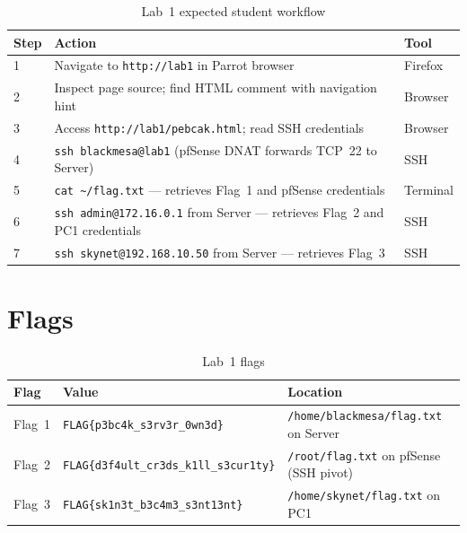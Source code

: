\begin{table}[H]
\centering
\small
\begin{tabularx}{\textwidth}{lXl}
\toprule
\textbf{Step} & \textbf{Action} & \textbf{Tool} \\
\midrule
1 & Navigate to \texttt{http://lab1} in Parrot browser                                       & Firefox  \\
2 & Inspect page source; find HTML comment with navigation hint                              & Browser  \\
3 & Access \texttt{http://lab1/pebcak.html}; read SSH credentials                            & Browser  \\
4 & \texttt{ssh blackmesa@lab1} (pfSense DNAT forwards TCP~22 to Server)                     & SSH      \\
5 & \texttt{cat \textasciitilde/flag.txt} --- retrieves Flag~1 and pfSense credentials        & Terminal \\
6 & \texttt{ssh admin@172.16.0.1} from Server --- retrieves Flag~2 and PC1 credentials       & SSH      \\
7 & \texttt{ssh skynet@192.168.10.50} from Server --- retrieves Flag~3                       & SSH      \\
\bottomrule
\end{tabularx}
\caption{Lab~1 expected student workflow}
\label{tab:lab1-workflow}
\end{table}

\section*{Flags}

\begin{table}[H]
\centering
\begin{tabularx}{\textwidth}{lXl}
\toprule
\textbf{Flag} & \textbf{Value} & \textbf{Location} \\
\midrule
Flag~1 & \texttt{FLAG\{p3bc4k\_s3rv3r\_0wn3d\}}         & \texttt{/home/blackmesa/flag.txt} on Server      \\
Flag~2 & \texttt{FLAG\{d3f4ult\_cr3ds\_k1ll\_s3cur1ty\}} & \texttt{/root/flag.txt} on pfSense (SSH pivot)   \\
Flag~3 & \texttt{FLAG\{sk1n3t\_b3c4m3\_s3nt13nt\}}       & \texttt{/home/skynet/flag.txt} on PC1            \\
\bottomrule
\end{tabularx}
\caption{Lab~1 flags}
\label{tab:lab1-flags-ref}
\end{table}
